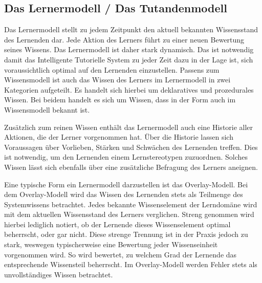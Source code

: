 
\subsection{Das Lernermodell / Das Tutandenmodell}
Das Lernermodell stellt zu jedem Zeitpunkt den aktuell bekannten Wissensstand des Lernenden dar.
Jede Aktion des Lerners führt zu einer neuen Bewertung seines Wissens. Das Lernermodell ist daher stark dynamisch.
Das ist notwendig damit das Intelligente Tutorielle System zu jeder Zeit dazu in der Lage ist, sich voraussichtlich optimal
auf den Lernenden einzustellen.
Passens zum Wissensmodell ist auch das Wissen des Lerners im Lernermodell in zwei Kategorien aufgeteilt.
Es handelt sich hierbei um deklaratives und prozedurales Wissen. Bei beidem handelt es sich um Wissen, dass
in der Form auch im Wissensmodell bekannt ist.

Zusätzlich zum reinen Wissen enthält das Lernermodell auch eine
Historie aller Aktionen, die der Lerner vorgenommen hat. Über die Historie lassen sich Voraussagen über Vorlieben, Stärken
und Schwächen des Lernenden treffen. Dies ist notwendig, um den Lernenden einem Lernstereotypen zuzuordnen.
Solches Wissen lässt sich ebenfalls über eine zusätzliche Befragung des Lerners aneignen.

Eine typische Form ein Lernermodell darzustellen ist das Overlay-Modell.
Bei dem Overlay-Modell wird das Wissen des Lernenden stets als Teilmenge des Systemwissens betrachtet.
Jedes bekannte Wissenselement der Lerndomäne wird mit dem aktuellen Wissensstand des Lerners verglichen.
Streng genommen wird hierbei lediglich notiert, ob der Lernende dieses Wissenselement optimal beherrscht, oder gar nicht.
Diese strenge Trennung ist in der Praxis jedoch zu stark, weswegen typischerweise eine Bewertung jeder Wissenseinheit vorgenommen wird.
So wird bewertet, zu welchem Grad der Lernende das entsprechende Wissensteil beherrscht.
Im Overlay-Modell werden Fehler stets als unvollständiges Wissen betrachtet.

